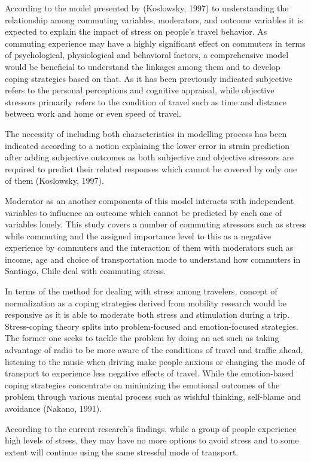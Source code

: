 \documentclass[
11pt, %
oneside, %
english, %
singlespacing, %
]{macthesis} %
\begin{document}
According to the model presented by (Koslowsky, 1997) to understanding the relationship among commuting variables, moderators, and outcome variables it is expected to explain the impact of stress on people's travel behavior. As commuting experience may have a highly significant effect on commuters in terms of psychological, physiological and behavioral factors, a comprehensive model would be beneficial to understand the linkages among them and to develop coping strategies based on that. As it has been previously indicated subjective refers to the personal perceptions and cognitive appraisal, while objective stressors primarily refers to the condition of travel such as time and distance between work and home or even speed of travel.

The necessity of including both characteristics in modelling process has been indicated according to a notion explaining the lower error in strain prediction after adding subjective outcomes as both subjective and objective stressors are required to predict their related responses which cannot be covered by only one of them (Koslowsky, 1997).

Moderator as an another components of this model interacts with independent variables to influence an outcome which cannot be predicted by each one of variables lonely. This study covers a number of commuting stressors such as stress while commuting and the assigned importance level to this as a negative experience by commuters and the interaction of them with moderators such as income, age and choice of transportation mode to understand how commuters in Santiago, Chile deal with commuting stress.

In terms of the method for dealing with stress among travelers, concept of normalization as a coping strategies derived from mobility research would be responsive as it is able to moderate both stress and stimulation during a trip. Stress-coping theory splits into problem-focused and emotion-focused strategies. The former one seeks to tackle the problem by doing an act such as taking advantage of radio to be more aware of the conditions of travel and traffic ahead, listening to the music when driving make people anxious or changing the mode of transport to experience less negative effects of travel. While the emotion-based coping strategies concentrate on minimizing the emotional outcomes of the problem through various mental process such as wishful thinking, self-blame and avoidance (Nakano, 1991).

According to the current research's findings, while a group of people experience high levels of stress, they may have no more options to avoid stress and to some extent will continue using the same stressful mode of transport.
\end{document}
